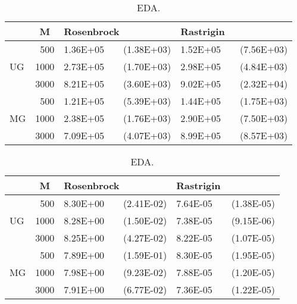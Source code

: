 \begin{table}[tbp]
\centering
\caption{\aexpcontinuousnum EDA.}
\begin{tabular}{|lr|rr|rr|} \hline
\multicolumn{1}{|l|}{}&\multicolumn{1}{|c|}{M} & \multicolumn{2}{l|}{Rosenbrock} & \multicolumn{2}{l|}{Rastrigin} \\ \hline
\multicolumn{1}{|l|}{\multirow{3}{*}{UG}} & 500 & 1.36E+05 & ~~(1.38E+03) & 1.52E+05 & ~~(7.56E+03) \\ \cline{2-6}
\multicolumn{1}{|l|}{} & 1000 & 2.73E+05 & ~~(1.70E+03) & 2.98E+05 & ~~(4.84E+03) \\ \cline{2-6}
\multicolumn{1}{|l|}{} & 3000 & 8.21E+05 & ~~(3.60E+03) & 9.02E+05 & ~~(2.32E+04) \\ \hline
\multicolumn{1}{|l|}{\multirow{3}{*}{MG}} & 500 & 1.21E+05 & ~~(5.39E+03) & 1.44E+05 & ~~(1.75E+03) \\ \cline{2-6}
\multicolumn{1}{|l|}{} & 1000 & 2.38E+05 & ~~(1.76E+03) & 2.90E+05 & ~~(7.50E+03) \\ \cline{2-6}
\multicolumn{1}{|l|}{} & 3000 & 7.09E+05 & ~~(4.07E+03) & 8.99E+05 & ~~(8.57E+03) \\ \hline
\end{tabular}
\label{aexp-cont-eva-eda}


\centering 
\caption{\aexpcontinuousnum EDA.}
\begin{tabular}{|lr|rr|rr|} \hline
\multicolumn{1}{|l|}{}&\multicolumn{1}{|c|}{M} & \multicolumn{2}{l|}{Rosenbrock} & \multicolumn{2}{l|}{Rastrigin} \\ \hline
\multicolumn{1}{|l|}{\multirow{3}{*}{UG}} & 500 & 8.30E+00 & ~~(2.41E-02) & 7.64E-05 & ~~(1.38E-05) \\ \cline{2-6}
\multicolumn{1}{|l|}{} & 1000 & 8.28E+00 & ~~(1.50E-02) & 7.38E-05 & ~~(9.15E-06) \\ \cline{2-6}
\multicolumn{1}{|l|}{} & 3000 & 8.25E+00 & ~~(4.27E-02) & 8.22E-05 & ~~(1.07E-05) \\ \hline
\multicolumn{1}{|l|}{\multirow{3}{*}{MG}} & 500 & 7.89E+00 & ~~(1.59E-01) & 8.30E-05 & ~~(1.95E-05) \\ \cline{2-6}
\multicolumn{1}{|l|}{} & 1000 & 7.98E+00 & ~~(9.23E-02) & 7.88E-05 & ~~(1.20E-05) \\ \cline{2-6}
\multicolumn{1}{|l|}{} & 3000 & 7.91E+00 & ~~(6.77E-02) & 7.36E-05 & ~~(1.22E-05) \\ \hline
\end{tabular}
\label{aexp-cont-val-eda}



\end{table}
